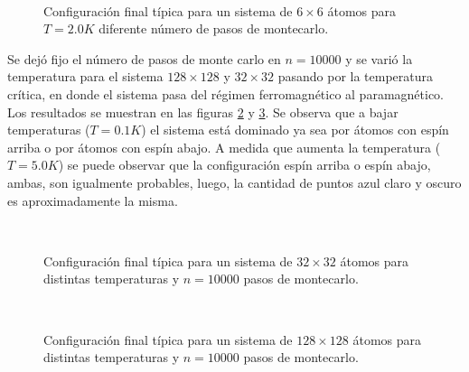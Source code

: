 \documentclass[a4paper,12pt]{article}
\begin{document}
\begin{figure}[H]
  \centering
  \\
  \caption{Configuración final típica para un sistema de $6 \times 6$ átomos para $T = 2.0 K$ diferente número de pasos de montecarlo.}
  \label{fig:snaps_6x6}
\end{figure}


\noindent Se dejó fijo el número de pasos de monte carlo en $n = 10000$ y se varió la temperatura para el sistema $128 \times 128$ y $32 \times 32$ pasando por la temperatura crítica, en donde el sistema pasa del régimen ferromagnético al paramagnético. Los resultados se muestran en las figuras \ref{fig:snaps_32x32} y \ref{fig:snaps_128x128}. Se observa que a bajar temperaturas ($T = 0.1 K$) el sistema está dominado ya sea por átomos con espín arriba o por átomos con espín abajo. A medida que aumenta la temperatura ($T = 5.0 K$) se puede observar que la configuración espín arriba o espín abajo, ambas, son igualmente probables, luego, la cantidad de puntos azul claro y oscuro es aproximadamente la misma.


\begin{figure}[H]
  \centering
  \\
  \caption{Configuración final típica para un sistema de $32 \times 32$  átomos para distintas temperaturas y $n = 10000$ pasos de montecarlo.}
  \label{fig:snaps_32x32}
\end{figure}

\begin{figure}[H]
  \centering
  \\
  \caption{Configuración final típica para un sistema de $128 \times 128$ átomos para distintas temperaturas y $n = 10000$ pasos de montecarlo.}
  \label{fig:snaps_128x128}
\end{figure}
\end{document}
